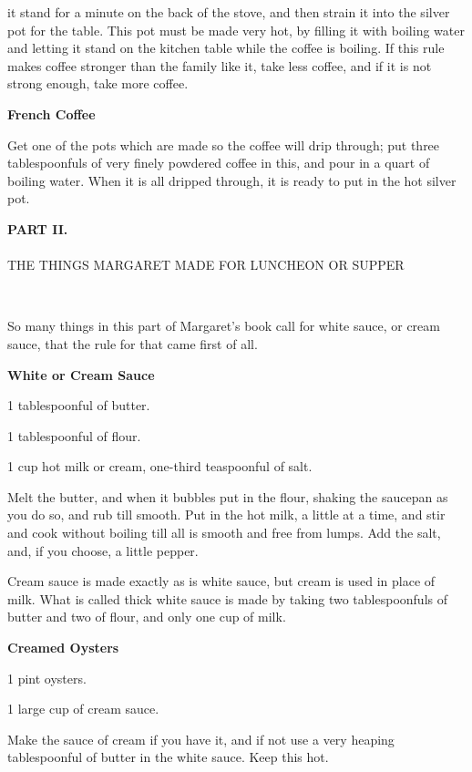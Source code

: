 \documentclass[11pt]{book}
\newcommand{\indpar}{\par\noindent\hspace*{\parindent}}
\newcommand{\ingredient}{\indpar}
\newcommand{\instruction}{\indpar}
\newenvironment{RecipeTitle}{\medskip\begin{center}\large\bf }{\end{center}\smallskip}
\begin{document}
it stand for a minute on the back of the stove, and then strain
it into the silver pot for the table.  This pot must be made
very hot, by filling it with boiling water and letting it
stand on the kitchen table while the coffee is boiling.  If
this rule makes coffee stronger than the family like it, take
less coffee, and if it is not strong enough, take more coffee.
\begin{RecipeTitle}
French Coffee\label{french_coffee}
\end{RecipeTitle}
\instruction
  Get one of the pots which are made so the coffee will drip
through; put three tablespoonfuls of very finely powdered
coffee in this, and pour in a quart of boiling water.  When
it is all dripped through, it is ready to put in the hot
silver pot.
\newpage
\thispagestyle{empty}
\ 
\newpage
\thispagestyle{empty}
\vspace*{30ex}
\begin{center}
{\large \bf PART II.}\\
\ \\
THE THINGS MARGARET MADE FOR LUNCHEON OR SUPPER\label{PART_II}
\end{center}
\newpage
\thispagestyle{empty}
\ 
\newpage
\thispagestyle{plain}
\indpar
   So many things in this part of Margaret's book call for white
sauce, or cream sauce, that the rule for that came first of all.
\begin{RecipeTitle}
White or Cream Sauce\label{white_or_cream_sauce}
\end{RecipeTitle}
\ingredient  1 tablespoonful of butter.
\ingredient  1 tablespoonful of flour.
\ingredient  1 cup hot milk or cream, one-third teaspoonful of salt.
\instruction
  Melt the butter, and when it bubbles put in the flour, shaking
the saucepan as you do so, and rub till smooth.  Put in the hot
milk, a little at a time, and stir and cook without boiling till
all is smooth and free from lumps.  Add the salt, and, if you
choose, a little pepper.
\instruction
  Cream sauce is made exactly as is white sauce, but cream is
used in place of milk.  What is called thick white sauce is made
by taking two tablespoonfuls of butter and two of flour, and
only one cup of milk.
\begin{RecipeTitle}
Creamed Oysters\label{creamed_oysters}
\end{RecipeTitle}
\ingredient  1 pint oysters.
\ingredient  1 large cup of cream sauce.
\instruction
  Make the sauce of cream if you have it, and if not use a very
heaping tablespoonful of butter in the white sauce.  Keep this hot.
\instruction
\end{document}
